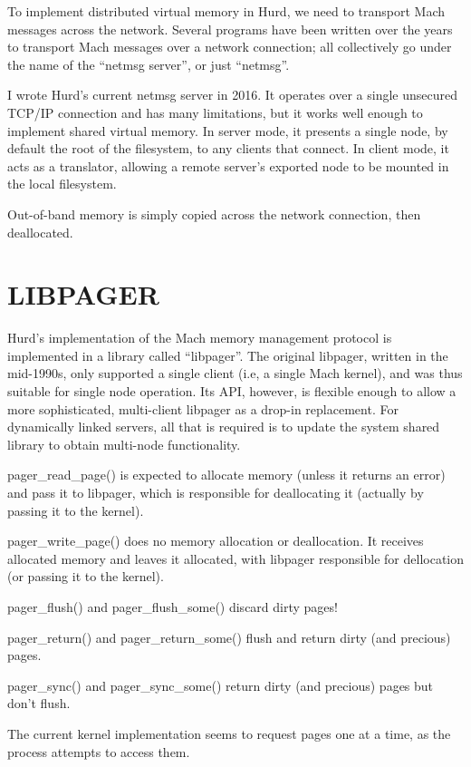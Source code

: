 \documentclass{article}
\begin{document}
To implement distributed virtual memory in Hurd, we need to transport
Mach messages across the network.  Several programs have been written
over the years to transport Mach messages over a network connection;
all collectively go under the name of the ``netmsg server'', or just
``netmsg''.

I wrote Hurd's current netmsg server in 2016.  It operates over a
single unsecured TCP/IP connection and has many limitations, but it
works well enough to implement shared virtual memory.  In server mode,
it presents a single node, by default the root of the filesystem, to
any clients that connect.  In client mode, it acts as a translator,
allowing a remote server's exported node to be mounted in the
local filesystem.

Out-of-band memory is simply
copied across the network connection, then deallocated.


\section{LIBPAGER}

Hurd's implementation of the Mach memory management protocol is
implemented in a library called ``libpager''.  The original libpager,
written in the mid-1990s, only supported a single client (i.e, a
single Mach kernel), and was thus suitable for single node operation.
Its API, however, is flexible enough to allow a more sophisticated,
multi-client libpager as a drop-in replacement.  For dynamically
linked servers, all that is required is to update the system shared
library to obtain multi-node functionality.

pager_read_page() is expected to allocate memory (unless it returns an
error) and pass it to libpager, which is responsible for deallocating
it (actually by passing it to the kernel).

pager_write_page() does no memory allocation or deallocation.  It
receives allocated memory and leaves it allocated, with libpager
responsible for dellocation (or passing it to the kernel).

pager_flush() and pager_flush_some() discard dirty pages!

pager_return() and pager_return_some() flush and return dirty (and precious) pages.

pager_sync() and pager_sync_some() return dirty (and precious) pages but don't flush.

The current kernel implementation seems to request pages one at
a time, as the process attempts to access them.
\end{document}
